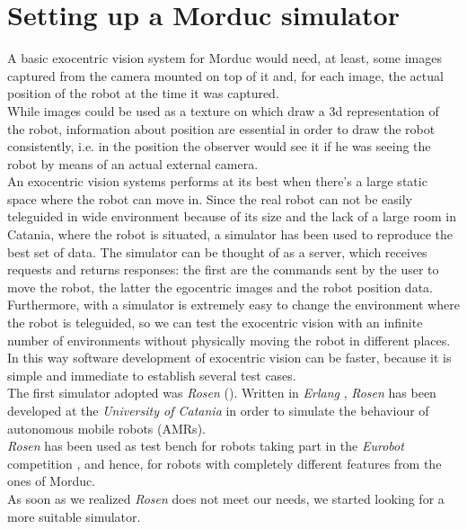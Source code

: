 \setcounter{figure}{0}
\setcounter{table}{0}
\setcounter{lstlisting}{0}

\section{Setting up a Morduc simulator}
\label{sec:simulator}

A basic exocentric vision system for Morduc would need, 
at least, some images captured from the camera mounted 
on top of it and, for each image, the actual position of 
the robot at the time it was captured.
\\
While images could be used as a texture on which draw 
a 3d representation of the robot, information about 
position are essential in order to draw the robot 
consistently, i.e. in the position the observer would 
see it if he was seeing the robot by means of an actual 
external camera.
\\
An exocentric vision systems performs at its best 
when there's a large static space where the robot can move in. Since 
the real robot can not be easily teleguided in wide 
environment because of its size and the lack of a large 
room in Catania, where the robot is situated, a simulator 
has been used to reproduce the best set of data. The 
simulator can be thought of as a server, which receives 
requests and returns responses: the first are the commands 
sent by the user to move the robot, the latter the 
egocentric images and the robot position data.
\\
Furthermore, with a simulator is extremely easy to 
change the environment where the robot is teleguided, 
so we can test the exocentric vision with an infinite 
number of environments without physically moving the 
robot in different places. In this way software 
development of exocentric vision can be faster, because 
it is simple and immediate to establish several test cases.
\\
The first simulator adopted was \textit{Rosen} (\cite{rosen}). Written in 
\textit{Erlang} \cite{erlang}, \textit{Rosen} has been developed at
the \textit{University of Catania} in order to simulate the behaviour of
autonomous mobile robots (AMRs).
\\
\textit{Rosen} has been used as test bench for robots taking part in 
the \textit{Eurobot} competition \cite{eurobot}, and hence, 
for robots with completely different features from the ones of Morduc. 
\\
As soon as we realized \textit{Rosen} does not meet our needs, 
we started looking for a more suitable simulator.
